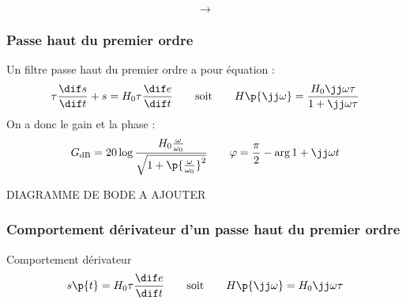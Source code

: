     
    \begin{minipage}{0.48\linewidth}
        \begin{center}
        \end{center}
    \end{minipage}
    \begin{minipage}{0.04\linewidth}
        \[ \rightarrow \]
    \end{minipage}
    \begin{minipage}{0.48\linewidth}
        \begin{center}
        \end{center}
    \end{minipage}
    
    \subsubsection{Passe haut du premier ordre}
    
    Un filtre passe haut du premier ordre a pour équation :
    \[ \tau \dfrac{\dif s}{\dif t} + s = H_0\tau \dfrac{\dif e}{\dif t} \qquad\text{soit}\qquad H\p{\jj\omega} = \dfrac{H_0\jj \omega \tau}{1 + \jj\omega \tau}\]
    On a donc le gain et la phase :
    \[ G_\text{dB} = 20\log \dfrac{H_0\frac{\omega}{\omega_0} }{ \sqrt{1 + \p{\frac{\omega}{\omega_0}}^2}} \qquad \varphi = \dfrac{\pi}{2} - \arg{1 + \jj\omega t}\]
    
    DIAGRAMME DE BODE A AJOUTER
    
    \subsubsection{Comportement dérivateur d'un passe haut du premier ordre}
    
    \begin{definition}{Comportement dérivateur}{}
    \[ s\p{t} = H_0\tau \dfrac{\dif e}{\dif t} \qquad\text{soit}\qquad H\p{\jj\omega} = H_0\jj\omega \tau\]
    \end{definition}
    
